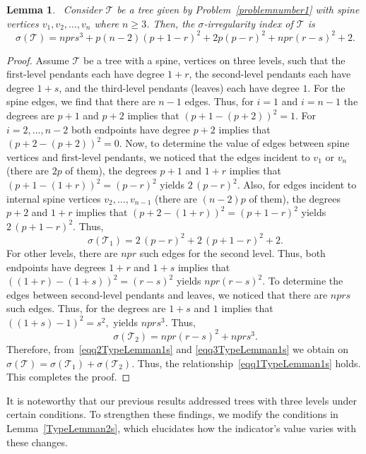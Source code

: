 \documentclass[12pt, a4paper]{article}
\theoremstyle{plain}  %
\newtheorem{lemma}[theorem]{Lemma}
\theoremstyle{definition}  %
\newcommand{\TT}{\mathcal{T}}
\begin{document}
\begin{lemma}~\label{TypeLemman1s}
Consider $\TT$ be a tree given by Problem~\ref{problemnumber1} with spine vertices $v_1,v_2,\dots,v_n$ where $n\geqslant 3$. Then, the $\sigma$-irregularity index of $\TT$ is
\begin{equation}~\label{eqq1TypeLemman1s}
\sigma(\TT)=nprs^3+p(n-2)(p+1-r)^2+2p(p-r)^2+npr(r-s)^2+2.
\end{equation}
\end{lemma}
\begin{proof}
Assume $\TT$ be a tree with a spine, vertices on three levels, such that the first-level pendants each have degree $1+r$, the second-level pendants each have degree $1+s$, and the third-level pendants (leaves) each have degree $1$. For the spine edges, we find that there are $n-1$ edges. Thus, for  $i=1$ and $i=n-1$ the degrees are $p+1$ and $p+2$ implies that $(p+1-(p+2))^2=1$. For $i=2,\dots,n-2$ both endpoints have degree $p+2$ implies that $(p+2-(p+2))^2=0$. Now, to determine the value of edges between spine vertices and first-level pendants, we noticed that the edges incident to $v_1$ or $v_n$ (there are $2p$ of them), the degrees $p+1$ and $1+r$ implies that $(p+1-(1+r))^2=(p-r)^2$ yields $2\,(p-r)^2$. Also, for edges incident to internal spine vertices $v_2,\dots,v_{n-1}$ (there are $(n-2)p$ of them), the degrees $p+2$ and $1+r$ implies that $(p+2-(1+r))^2=(p+1-r)^2$ yields $2\,(p+1-r)^2$. Thus, 
\begin{equation}~\label{eqq2TypeLemman1s}
\sigma(\TT_1)=2\,(p-r)^2+2\,(p+1-r)^2+2.
\end{equation}
For other levels, there are $npr$ such edges for the second level. Thus, both endpoints have degrees $1+r$ and $1+s$ implies that $((1+r)-(1+s))^2=(r-s)^2$ yields $npr(r-s)^2.$ To determine the edges between second-level pendants and leaves, we noticed that there are $nprs$ such edges. Thus, for the degrees are $1+s$ and $1$ implies that $((1+s)-1)^2=s^2,$ yields $nprs^3.$ Thus, 
\begin{equation}~\label{eqq3TypeLemman1s}
\sigma(\TT_2)=npr(r-s)^2+nprs^3.
\end{equation}
Therefore, from~\eqref{eqq2TypeLemman1s} and \eqref{eqq3TypeLemman1s} we obtain on $\sigma(\TT)=\sigma(\TT_1)+\sigma(\TT_2).$ Thus, the relationship~\eqref{eqq1TypeLemman1s} holds. This completes the proof.
\end{proof}

It is noteworthy that our previous results addressed trees with three levels under certain conditions. 
To strengthen these findings, we modify the conditions in Lemma~\ref{TypeLemman2s}, which elucidates how the indicator's value varies with these changes.
\end{document}
